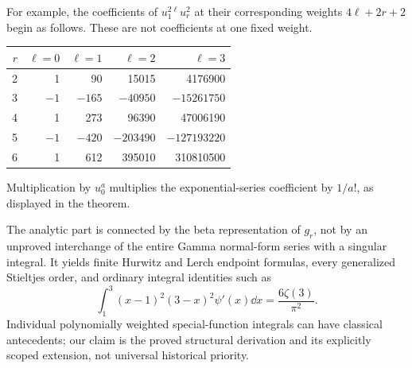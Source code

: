 For example, the coefficients of $u_1^{2\ell}u_r^2$ at their corresponding
weights $4\ell+2r+2$ begin as follows. These are not coefficients at
one fixed weight.
\begin{center}
\begin{tabular}{@{}rrrrr@{}}
\toprule
$r$ & $\ell=0$ & $\ell=1$ & $\ell=2$ & $\ell=3$\\
\midrule
2&1&90&15015&4176900\\
3&$-1$&$-165$&$-40950$&$-15261750$\\
4&1&273&96390&47006190\\
5&$-1$&$-420$&$-203490$&$-127193220$\\
6&1&612&395010&310810500\\
\bottomrule
\end{tabular}
\end{center}
Multiplication by $u_0^a$ multiplies the exponential-series coefficient
by $1/a!$, as displayed in the theorem.

The analytic part is connected by the beta representation of $g_r$,
not by an unproved interchange of the entire Gamma normal-form series
with a singular integral. It yields finite Hurwitz and Lerch endpoint
formulas, every generalized Stieltjes order, and ordinary integral
identities such as
\begin{equation}\label{ag:eq:trigamma-preview}
 \int_1^3(x-1)^2(3-x)^2\psi'(x)\dd x=\frac{6\zeta(3)}{\pi^2}.
\end{equation}
Individual polynomially weighted special-function integrals can have
classical antecedents; our claim is the proved structural derivation
and its explicitly scoped extension, not universal historical priority.
